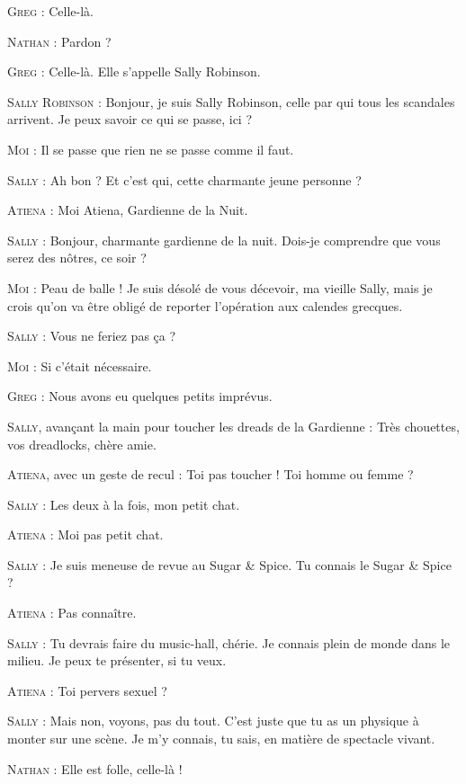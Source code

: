 \begin{dialogue}

\textsc{Greg} : Celle-là.

\textsc{Nathan} : Pardon ?

\textsc{Greg} : Celle-là. Elle s’appelle Sally Robinson.

\textsc{Sally Robinson} : Bonjour, je suis Sally Robinson, celle par qui tous les scandales arrivent. Je peux savoir ce qui se passe, ici ?

\textsc{Moi} : Il se passe que rien ne se passe comme il faut.

\textsc{Sally} : Ah bon ? Et c’est qui, cette charmante jeune personne ?

\textsc{Atiena} : Moi Atiena, Gardienne de la Nuit.

\textsc{Sally} : Bonjour, charmante gardienne de la nuit. Dois-je comprendre que vous serez des nôtres, ce soir ?

\textsc{Moi} : Peau de balle ! Je suis désolé de vous décevoir, ma vieille Sally, mais je crois qu’on va être obligé de reporter l’opération aux calendes grecques.

\textsc{Sally} : Vous ne feriez pas ça ?

\textsc{Moi} : Si c’était nécessaire.

\textsc{Greg} : Nous avons eu quelques petits imprévus.

\textsc{Sally}, avançant la main pour toucher les dreads de la Gardienne : Très chouettes, vos dreadlocks, chère amie.

\textsc{Atiena}, avec un geste de recul : Toi pas toucher ! Toi homme ou femme ?

\textsc{Sally} : Les deux à la fois, mon petit chat.

\textsc{Atiena} : Moi pas petit chat.

\textsc{Sally} : Je suis meneuse de revue au Sugar \& Spice. Tu connais le Sugar \& Spice ?

\textsc{Atiena} : Pas connaître.

\textsc{Sally} : Tu devrais faire du music-hall, chérie. Je connais plein de monde dans le milieu. Je peux te présenter, si tu veux.

\textsc{Atiena} : Toi pervers sexuel ?

\textsc{Sally} : Mais non, voyons, pas du tout. C’est juste que tu as un physique à monter sur une scène. Je m’y connais, tu sais, en matière de spectacle vivant.

\textsc{Nathan} : Elle est folle, celle-là !


\end{dialogue}
